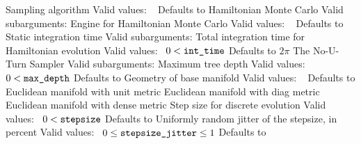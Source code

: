 \begin{description}
      {Sampling algorithm}
      {Valid values: \  }
      {Defaults to }
%
        {Hamiltonian Monte Carlo}
        {Valid subarguments: }
%
          {Engine for Hamiltonian Monte Carlo}
          {Valid values: \  }
          {Defaults to }
%
            {Static integration time}
            {Valid subarguments: }
%
              {Total integration time for Hamiltonian evolution}
              {Valid values: \  $0 < \mbox{{\tt int\_time}}$}
              {Defaults to $2\pi$}
%
            {The No-U-Turn Sampler}
            {Valid subarguments: }
%
              {Maximum tree depth}
              {Valid values: \  $0 < \mbox{{\tt max\_depth}}$}
              {Defaults to }
%
          {Geometry of base manifold}
          {Valid values: \  }
          {Defaults to }
%
            {Euclidean manifold with unit metric}
%
            {Euclidean manifold with diag metric}
%
            {Euclidean manifold with dense metric}
%
          {Step size for discrete evolution}
          {Valid values: \  $0 < {\tt stepsize}$}
          {Defaults to }
%
          {Uniformly random jitter of the stepsize, in percent}
          {Valid values: \  $0 \leq \mbox{{\tt stepsize\_jitter}} \leq 1$}
          {Defaults to }
\end{description}

